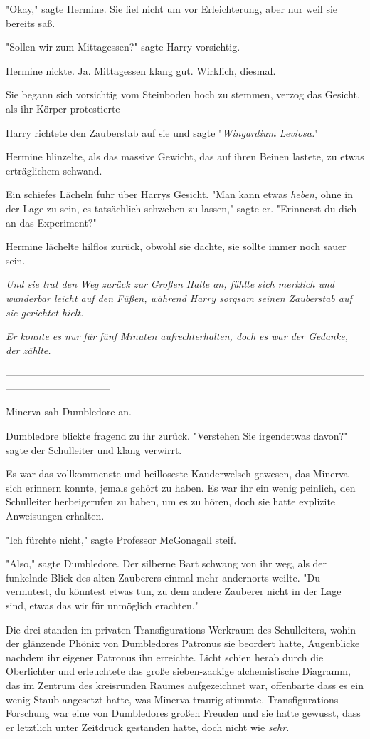 {"Okay," sagte Hermine. Sie fiel nicht um vor Erleichterung, aber nur weil sie bereits saß.

"Sollen wir zum Mittagessen?" sagte Harry vorsichtig.

Hermine nickte. Ja. Mittagessen klang gut. Wirklich, diesmal.

Sie begann sich vorsichtig vom Steinboden hoch zu stemmen, verzog das Gesicht, als ihr Körper protestierte -

Harry richtete den Zauberstab auf sie und sagte "\emph{Wingardium Leviosa.}"

Hermine blinzelte, als das massive Gewicht, das auf ihren Beinen lastete, zu etwas erträglichem schwand.

Ein schiefes Lächeln fuhr über Harrys Gesicht. "Man kann etwas \emph{heben,} ohne in der Lage zu sein, es tatsächlich schweben zu lassen," sagte er. "Erinnerst du dich an das Experiment?"

Hermine lächelte hilflos zurück, obwohl sie dachte, sie sollte immer noch sauer sein.

\emph{Und sie trat den Weg zurück zur Großen Halle an, fühlte sich merklich und wunderbar leicht auf den Füßen, während Harry sorgsam seinen Zauberstab auf sie gerichtet hielt.}

\emph{Er konnte es nur für fünf Minuten aufrechterhalten, doch es war der Gedanke, der zählte.}

--------------------------------------------------------------------------------------------------------------------------------------------

Minerva sah Dumbledore an.

Dumbledore blickte fragend zu ihr zurück. "Verstehen Sie irgendetwas davon?" sagte der Schulleiter und klang verwirrt.

Es war das vollkommenste und heilloseste Kauderwelsch gewesen, das Minerva sich erinnern konnte, jemals gehört zu haben. Es war ihr ein wenig peinlich, den Schulleiter herbeigerufen zu haben, um es zu hören, doch sie hatte explizite Anweisungen erhalten.

"Ich fürchte nicht," sagte Professor McGonagall steif.

"Also," sagte Dumbledore. Der silberne Bart schwang von ihr weg, als der funkelnde Blick des alten Zauberers einmal mehr andernorts weilte. "Du vermutest, du könntest etwas tun, zu dem andere Zauberer nicht in der Lage sind, etwas das wir für unmöglich erachten."

Die drei standen im privaten Transfigurations-Werkraum des Schulleiters, wohin der glänzende Phönix von Dumbledores Patronus sie beordert hatte, Augenblicke nachdem ihr eigener Patronus ihn erreichte. Licht schien herab durch die Oberlichter und erleuchtete das große sieben-zackige alchemistische Diagramm, das im Zentrum des kreisrunden Raumes aufgezeichnet war, offenbarte dass es ein wenig Staub angesetzt hatte, was Minerva traurig stimmte. Transfigurations-Forschung war eine von Dumbledores großen Freuden und sie hatte gewusst, dass er letztlich unter Zeitdruck gestanden hatte, doch nicht wie \emph{sehr.}

}
